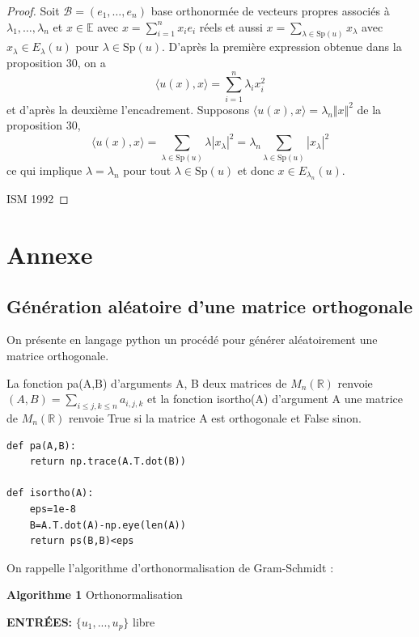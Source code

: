 \begin{proof}

Soit $\mathcal{B} = (e_1, \dots, e_n)$ base orthonormée de vecteurs propres associés à $\lambda_1, \dots, \lambda_n$ et $x \in \mathbb{E}$ avec $x = \sum_{i=1}^n x_i e_i$ réels et aussi $x = \sum_{\lambda \in \text{Sp}(u)} x_\lambda$ avec $x_\lambda \in E_\lambda(u)$ pour $\lambda \in \text{Sp}(u)$. D'après la première expression obtenue dans la proposition 30, on a
\[
\langle u(x), x \rangle = \sum_{i=1}^n \lambda_i x_i^2
\]
et d'après la deuxième l'encadrement. Supposons $\langle u(x), x \rangle = \lambda_n \Vert x \Vert^2$ de la proposition 30,
\[
\langle u(x), x \rangle = \sum_{\lambda \in \text{Sp}(u)} \lambda |x_\lambda|^2 = \lambda_n \sum_{\lambda \in \text{Sp}(u)} |x_\lambda|^2
\]
ce qui implique $\lambda = \lambda_n$ pour tout $\lambda \in \text{Sp}(u)$ et donc $x \in E_{\lambda_n}(u)$.

ISM 1992


\end{proof}

\section*{Annexe}

\subsection*{Génération aléatoire d'une matrice orthogonale}

On présente en langage python un procédé pour générer aléatoirement une matrice orthogonale.

La fonction pa(A,B) d'arguments A, B deux matrices de $M_n(\mathbb{R})$ renvoie $(A, B) = \sum_{i \leq j, k \leq n} a_{i,j,k}$
et la fonction isortho(A) d'argument A une matrice de $M_n(\mathbb{R})$ renvoie True si la matrice A est orthogonale et False sinon.

\begin{verbatim}
def pa(A,B):
    return np.trace(A.T.dot(B))

def isortho(A):
    eps=1e-8
    B=A.T.dot(A)-np.eye(len(A))
    return ps(B,B)<eps
\end{verbatim}

On rappelle l'algorithme d'orthonormalisation de Gram-Schmidt :

\textbf{Algorithme 1} Orthonormalisation

\textbf{ENTRÉES:} $\{u_1, ..., u_p\}$ libre

